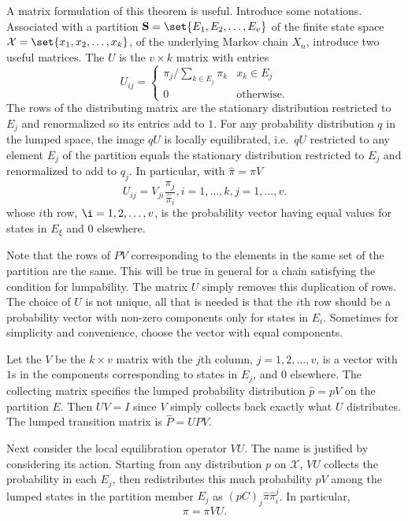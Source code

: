 \documentclass[12pt]{article}
\begin{document}
A matrix formulation of this theorem is useful. Introduce some
notations. Associated with a partition \( \mathbf{S} = \set{E_1, E_2,
\dots, E_v} \) of the finite state space \( \mathcal{X} = \set{x_1, x_2,
\dots, x_k} \), of the underlying Markov chain \( X_n \), introduce two
useful matrices.  The %
\( U \) is the \( v \times k \) matrix with entries
\[
    U_{ij} =
    \begin{cases}
        \pi_j/\sum_{k \in E_j} \pi_k & x_k \in E_j \\
        0 & \text{otherwise}.
    \end{cases}
\] The rows of the distributing matrix are the stationary distribution
restricted to \( E_j \) and renormalized so its entries add to \( 1 \).
For any probability distribution \( q \) in the lumped space, the image \(
qU \) is locally equilibrated, i.e.\ \( qU \) restricted to any element \(
E_j \) of the partition equals the stationary distribution restricted to
\( E_j \) and renormalized to add to \( q_j \).  In particular, with \(
\hat{\pi} = \pi V \)
\[
    U_{ij} = V_{ji} \frac{\pi_j}{\hat{\pi}_{i}}, i = 1, \dots, k, j = 1,
    \dots, v.
\] whose \( i \)th row, \( \i = 1, 2, \dots, v \), is the probability
vector having equal values for states in \( E_{\xi} \) and \( 0 \)
elsewhere.

Note that the rows of \( PV \) corresponding to the elements in the same
set of the partition are the same.  This will be true in general for a
chain satisfying the condition for lumpability.  The matrix \( U \)
simply removes this duplication of rows.  The choice of \( U \) is not
unique, all that is needed is that the \( i \)th row should be a
probability vector with non-zero components only for states in \( E_i \).
Sometimes for simplicity and convenience, choose the vector with equal
components.

Let the %
\( V \) be the \( k \times v \) matrix with the \( j \)th column, \( j =
1, 2, \dots, v \), is a vector with \( 1 \)s in the components
corresponding to states in \( E_j \), and \( 0 \) elsewhere.  The
collecting matrix specifies the lumped probability distribution \( \hat{p}
= p V \) on the partition \( E \).  Then \( UV = I \) since \( V \)
simply collects back exactly what \( U \) distributes.  The lumped
transition matrix is \( \hat{P} = UPV \).

Next consider the local equilibration operator \( VU \).  The name is
justified by considering its action.  Starting from any distribution \(
p \) on \( \mathcal{X} \), \( VU \) collects the probability in each \(
E_j \), then redistributes this much probability \( pV \) among the
lumped states in the partition member \( E_j \) as \( (pC)_j \hat{\pi}
\hat{\pi}_i^j \).  In particular,
\[
    \pi = \pi VU.
\]
\end{document}
